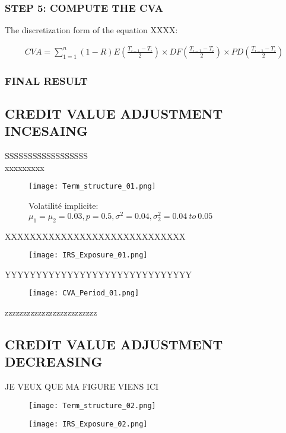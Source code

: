 \documentclass[11pt]{article}
\numberwithin{equation}{subsection}
\begin{document}
\subsubsection{STEP 5: COMPUTE THE CVA}
The discretization form of the equation XXXX:

\begin{eqnarray*}
	CVA = \sum_{1=1}^{n} (1-R) E(\frac{T_{i-1}-T_i}{2}) \times DF(\frac{T_{i-1}-T_i}{2})  \times PD(\frac{T_{i-1}-T_i}{2})
\end{eqnarray*}

\newpage
\subsubsection{FINAL RESULT}

\subsection{CREDIT VALUE ADJUSTMENT INCESAING}

SSSSSSSSSSSSSSSSSS\\
xxxxxxxxx
\begin{figure}[H]
	\texttt{[image: Term\_structure\_01.png]}
	\caption{Volatilité implicite: \(\mu_1=\mu_2=0.03, p=0.5, \sigma^2=0.04, \sigma_2^2=0.04 \ to \ 0.05\)}	
\end{figure}


XXXXXXXXXXXXXXXXXXXXXXXXXXXXX
\begin{figure}[H]
	\texttt{[image: IRS\_Exposure\_01.png]}
\end{figure}

YYYYYYYYYYYYYYYYYYYYYYYYYYYYYY

\begin{figure}[H]
	\texttt{[image: CVA\_Period\_01.png]}
\end{figure}

zzzzzzzzzzzzzzzzzzzzzzzzz

\subsection{CREDIT VALUE ADJUSTMENT DECREASING}

JE VEUX QUE MA FIGURE VIENS ICI

\begin{figure}[H]
	\texttt{[image: Term\_structure\_02.png]}
\end{figure}


\begin{figure}[H]
	\texttt{[image: IRS\_Exposure\_02.png]}
\end{figure}
\end{document}

